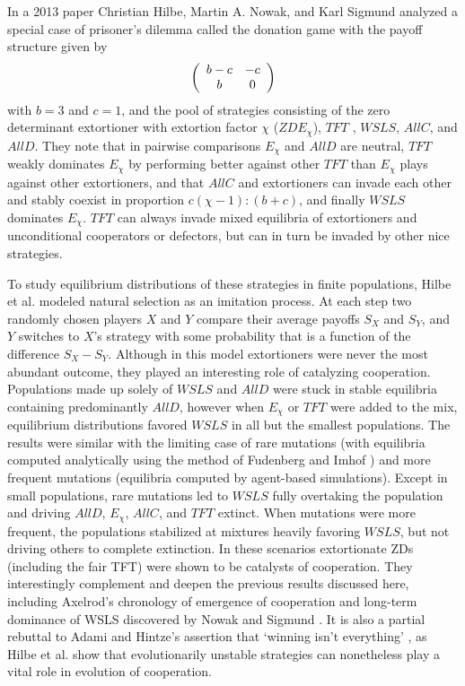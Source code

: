 In a 2013 paper Christian Hilbe, Martin A. Nowak, and Karl Sigmund analyzed a special case of prisoner's dilemma called the donation game with the payoff structure given by
\[
\left(
\begin{array}{c c}
b-c & -c\\
b & 0
\end{array}
\right)
\]
with $b = 3$ and $c = 1$, and the pool of strategies consisting of the zero determinant extortioner with extortion factor $\chi$ ($ZDE_\chi$), $TFT$ , $WSLS$, $AllC$, and $AllD$. They note that in pairwise comparisons $E_\chi$ and $AllD$ are neutral, $TFT$ weakly dominates $E_\chi$ by performing better against other $TFT$ than $E_\chi$ plays against other extortioners, and that $AllC$ and extortioners can invade each other and stably coexist in proportion $c(\chi-1):(b+c)$, and finally $WSLS$ dominates $E_\chi$. $TFT$ can always invade mixed equilibria of extortioners and unconditional cooperators or defectors, but can in turn be invaded by other nice strategies.

To study equilibrium distributions of these strategies in finite populations, Hilbe et al. modeled natural selection as an imitation process. At each step two randomly chosen players $X$ and $Y$ compare their average payoffs $S_X$ and $S_Y$, and $Y$ switches to $X$'s strategy with some probability that is a function of the difference $S_X - S_Y$. Although in this model extortioners were never the most abundant outcome, they played an interesting role of catalyzing cooperation. Populations made up solely of $WSLS$ and $AllD$ were stuck in stable equilibria containing predominantly $AllD$, however when $E_\chi$ or $TFT$ were added to the mix, equilibrium distributions favored $WSLS$ in all but the smallest populations. The results were similar with the limiting case of rare mutations (with equilibria computed analytically using the method of Fudenberg and Imhof \cite{Fudenberg_2006}) and more frequent mutations (equilibria computed by agent-based simulations). Except in small populations, rare mutations led to $WSLS$ fully overtaking the population and driving $AllD$, $E_\chi$, $AllC$, and $TFT$ extinct. When mutations were more frequent, the populations stabilized at mixtures heavily favoring $WSLS$, but not driving others to complete extinction. In these scenarios extortionate ZDs (including the fair TFT) were shown to be catalysts of cooperation. They interestingly complement and deepen the previous results discussed here, including Axelrod's chronology of emergence of cooperation \cite[p.55]{axelrod1984evolution} and long-term dominance of WSLS discovered by Nowak and Sigmund \cite{Nowak1993}. It is also a partial rebuttal to Adami and Hintze's assertion that `winning isn't everything' \cite{Adami_Hintze_2014}, as Hilbe et al. show that evolutionarily unstable strategies can nonetheless play a vital role in evolution of cooperation.

